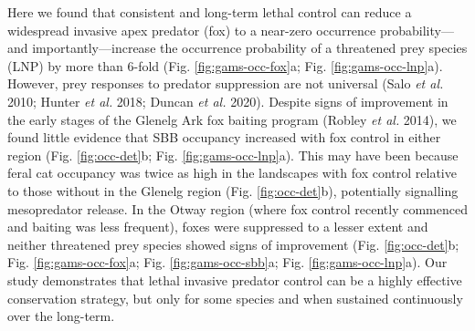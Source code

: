 \documentclass[11pt,a4paper,titlepage,twoside,openright]{style/unimelbthesis}
\begin{document}
\begin{mainmatter}
Here we found that consistent and long-term lethal control can reduce a widespread invasive apex predator (fox) to a near-zero occurrence probability---and importantly---increase the occurrence probability of a threatened prey species (LNP) by more than 6-fold (Fig. \ref{fig:gams-occ-fox}a; Fig. \ref{fig:gams-occ-lnp}a). However, prey responses to predator suppression are not universal (Salo \emph{et al.} 2010; Hunter \emph{et al.} 2018; Duncan \emph{et al.} 2020). Despite signs of improvement in the early stages of the Glenelg Ark fox baiting program (Robley \emph{et al.} 2014), we found little evidence that SBB occupancy increased with fox control in either region (Fig. \ref{fig:occ-det}b; Fig. \ref{fig:gams-occ-lnp}a). This may have been because feral cat occupancy was twice as high in the landscapes with fox control relative to those without in the Glenelg region (Fig. \ref{fig:occ-det}b), potentially signalling mesopredator release. In the Otway region (where fox control recently commenced and baiting was less frequent), foxes were suppressed to a lesser extent and neither threatened prey species showed signs of improvement (Fig. \ref{fig:occ-det}b; Fig. \ref{fig:gams-occ-fox}a; Fig. \ref{fig:gams-occ-sbb}a; Fig. \ref{fig:gams-occ-lnp}a). Our study demonstrates that lethal invasive predator control can be a highly effective conservation strategy, but only for some species and when sustained continuously over the long-term.


\end{mainmatter}
\end{document}
